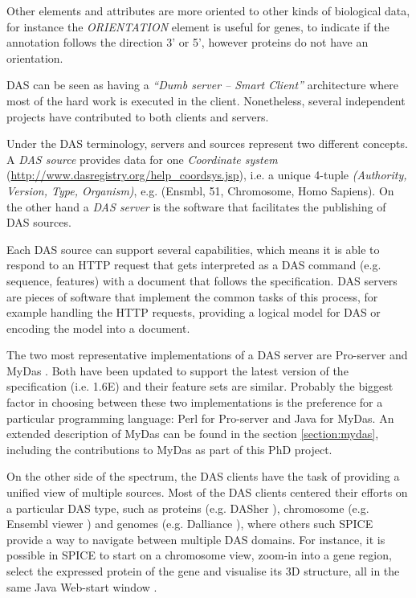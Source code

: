 Other elements and attributes are more oriented to other kinds of biological data, for instance the \emph{ORIENTATION} element is useful for genes, to indicate if the annotation follows the direction 3' or 5', however proteins do not have an orientation.

DAS can be seen as having a \emph{``Dumb server -- Smart Client''} architecture where most of the hard work is executed in the client. Nonetheless, several independent projects have contributed to both clients and servers. 

Under the DAS terminology, servers and sources represent two different concepts. A \emph{DAS source} provides data for one \emph{Coordinate system} (\url{http://www.dasregistry.org/help_coordsys.jsp}), i.e. a unique 4-tuple \emph{(Authority, Version, Type, Organism)}, e.g. (Ensmbl, 51, Chromosome, Homo Sapiens). On the other hand a \emph{DAS server} is the software that facilitates the publishing of DAS sources.

Each DAS source can support several capabilities, which means it is able to respond to an HTTP request that gets interpreted as a DAS command (e.g. sequence, features) with a document that follows the specification. DAS servers are pieces of software that implement the common tasks of this process, for example handling the HTTP requests, providing a logical model for DAS or encoding the model into a document.

The two most representative implementations of a DAS server are Pro-server \cite{FIN2007} and MyDas \cite{SAL2012}. Both have been updated to support the latest version of the specification (i.e. 1.6E) and their feature sets are similar. Probably the biggest factor in choosing between these two implementations is the preference for a particular programming language: Perl for Pro-server and Java for MyDas. An extended description of MyDas can be found in the section \ref{section:mydas}, including the contributions to MyDas as part of this PhD project.

On the other side of the spectrum, the DAS clients have the task of providing a unified view of multiple sources. Most of the DAS clients centered their efforts on a particular DAS type, such as proteins (e.g. DASher \cite{MES2009}), chromosome (e.g. Ensembl viewer \cite{FLI2011}) and genomes (e.g. Dalliance \cite{DOW2011}), where others such SPICE provide a way to navigate between multiple DAS domains. For instance, it is possible in SPICE to start on a chromosome view, zoom-in into a gene region, select the expressed protein of the gene and visualise its 3D structure, all in the same Java Web-start window \cite{PRL2005}.

